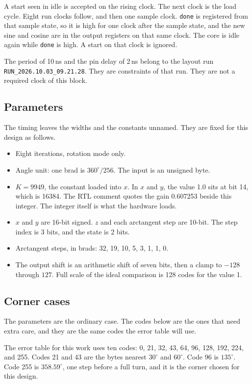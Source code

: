 \documentclass[11pt,a4paper]{article}
\begin{document}
A start seen in idle is accepted on the rising clock. The next clock is the load cycle. Eight run clocks follow, and then one sample clock. \texttt{done} is registered from that sample state, so it is high for one clock after the sample state, and the new sine and cosine are in the output registers on that same clock. The core is idle again while \texttt{done} is high. A start on that clock is ignored.

The period of 10\,ns and the pin delay of 2\,ns belong to the layout run \texttt{RUN\_2026.10.03\_09.21.28}. They are constraints of that run. They are not a required clock of this block.

\subsection{Parameters}
The timing leaves the widths and the constants unnamed. They are fixed for this design as follows.

\begin{itemize}
  \item Eight iterations, rotation mode only.
  \item Angle unit: one brad is \(360^\circ/256\). The input is an unsigned byte.
  \item \(K = 9949\), the constant loaded into \(x\). In \(x\) and \(y\), the value 1.0 sits at bit 14, which is 16384. The RTL comment quotes the gain 0.607253 beside this integer. The integer itself is what the hardware loads.
  \item \(x\) and \(y\) are 16-bit signed. \(z\) and each arctangent step are 10-bit. The step index is 3 bits, and the state is 2 bits.
  \item Arctangent steps, in brads: 32, 19, 10, 5, 3, 1, 1, 0.
  \item The output shift is an arithmetic shift of seven bits, then a clamp to \(-128\) through \(127\). Full scale of the ideal comparison is 128 codes for the value 1.
\end{itemize}

\subsection{Corner cases}
The parameters are the ordinary case. The codes below are the ones that need extra care, and they are the same codes the error table will use.

The error table for this work uses ten codes: 0, 21, 32, 43, 64, 96, 128, 192, 224, and 255. Codes 21 and 43 are the bytes nearest \(30^\circ\) and \(60^\circ\). Code 96 is \(135^\circ\). Code 255 is \(358.59^\circ\), one step before a full turn, and it is the corner chosen for this design.
\end{document}
